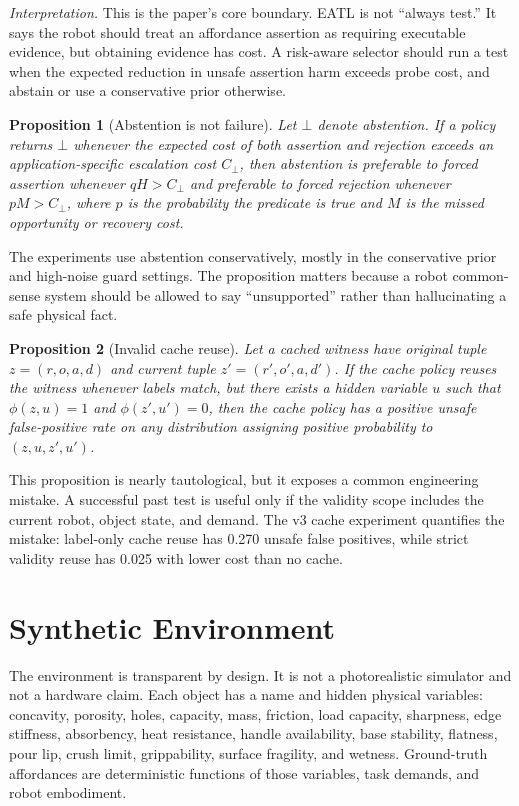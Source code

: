 \documentclass{article}
\newtheorem{proposition}{Proposition}
\begin{document}
\textit{Interpretation.}
This is the paper's core boundary.  EATL is not ``always test.''  It says the
robot should treat an affordance assertion as requiring executable evidence,
but obtaining evidence has cost.  A risk-aware selector should run a test when
the expected reduction in unsafe assertion harm exceeds probe cost, and abstain
or use a conservative prior otherwise.

\begin{proposition}[Abstention is not failure]
Let $\bot$ denote abstention.  If a policy returns $\bot$ whenever the expected
cost of both assertion and rejection exceeds an application-specific escalation
cost $C_{\bot}$, then abstention is preferable to forced assertion whenever
$qH > C_{\bot}$ and preferable to forced rejection whenever $pM>C_{\bot}$,
where $p$ is the probability the predicate is true and $M$ is the missed
opportunity or recovery cost.
\end{proposition}

The experiments use abstention conservatively, mostly in the conservative prior
and high-noise guard settings.  The proposition matters because a robot
common-sense system should be allowed to say ``unsupported'' rather than
hallucinating a safe physical fact.

\begin{proposition}[Invalid cache reuse]
Let a cached witness have original tuple $z=(r,o,a,d)$ and current tuple
$z'=(r',o',a,d')$.  If the cache policy reuses the witness whenever labels
match, but there exists a hidden variable $u$ such that
$\phi(z,u)=1$ and $\phi(z',u')=0$, then the cache policy has a positive unsafe
false-positive rate on any distribution assigning positive probability to
$(z,u,z',u')$.
\end{proposition}

This proposition is nearly tautological, but it exposes a common engineering
mistake.  A successful past test is useful only if the validity scope includes
the current robot, object state, and demand.  The v3 cache experiment quantifies
the mistake: label-only cache reuse has 0.270 unsafe false positives, while
strict validity reuse has 0.025 with lower cost than no cache.

\section{Synthetic Environment}

The environment is transparent by design.  It is not a photorealistic simulator
and not a hardware claim.  Each object has a name and hidden physical variables:
concavity, porosity, holes, capacity, mass, friction, load capacity, sharpness,
edge stiffness, absorbency, heat resistance, handle availability, base
stability, flatness, pour lip, crush limit, grippability, surface fragility, and
wetness.  Ground-truth affordances are deterministic functions of those
variables, task demands, and robot embodiment.
\end{document}
